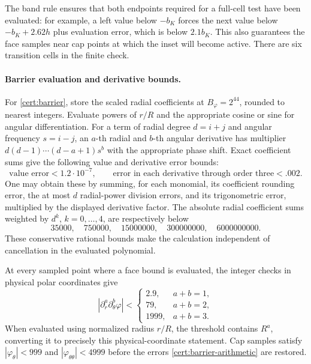 \documentclass[11pt]{article}
\numberwithin{equation}{section}
\theoremstyle{definition}
\theoremstyle{remark}
\begin{document}
The band rule ensures that both endpoints required for a full-cell test have been
evaluated: for example, a left value below $-b_K$ forces the next value
below $-b_K+2.62h$ plus evaluation error, which is below $2.1b_K$.
This also guarantees the face samples near cap points at which the inset
will become active.  There are six transition cells in the finite check.

\paragraph{Barrier evaluation and derivative bounds.}
For \eqref{cert:barrier}, store the scaled radial coefficients at
$B_\varphi=2^{44}$, rounded to nearest integers.  Evaluate powers of
$r/R$ and the appropriate cosine or sine for angular differentiation.
For a term of radial degree $d=i+j$ and angular frequency $s=i-j$, an
$a$-th radial and $b$-th angular derivative has multiplier
$d(d-1)\cdots(d-a+1)s^b$ with the appropriate phase shift.  Exact
coefficient sums give the following value and derivative error bounds:
\begin{equation}\label{cert:barrier-arithmetic}
 \text{value error}<1.2\cdot10^{-7},\qquad
 \text{error in each derivative through order three}<.002.
\end{equation}
One may obtain these by summing, for each monomial, its coefficient
rounding error, the at most $d$ radial-power division errors, and its
trigonometric error, multiplied by the displayed derivative factor.
The absolute radial coefficient sums weighted by $d^k$, $k=0,\ldots,4$,
are respectively below
\[
 35000,\quad750000,\quad15000000,\quad300000000,\quad6000000000.
\]
These conservative rational bounds make the calculation independent of
cancellation in the evaluated polynomial.

At every sampled point where a face bound is evaluated, the integer
checks in physical polar coordinates give
\begin{equation}\label{cert:face-jet-tests}
 |\partial_r^a\partial_\theta^b\varphi|<
 \begin{cases}2.9,&a+b=1,\\79,&a+b=2,\\1999,&a+b=3.\end{cases}
\end{equation}
When evaluated using normalized radius $r/R$, the threshold contains
$R^a$, converting it to precisely this physical-coordinate statement.
Cap samples satisfy $|\varphi_\theta|<999$ and
$|\varphi_{\theta\theta}|<4999$ before the errors
\eqref{cert:barrier-arithmetic} are restored.
\end{document}
